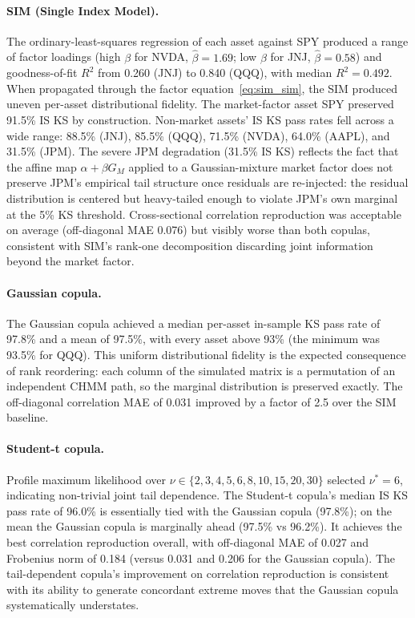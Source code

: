 \paragraph{SIM (Single Index Model).}
The ordinary-least-squares regression of each asset against SPY produced a range of factor loadings (high $\beta$ for NVDA, $\hat{\beta} = 1.69$; low $\beta$ for JNJ, $\hat{\beta} = 0.58$) and goodness-of-fit $R^2$ from 0.260 (JNJ) to 0.840 (QQQ), with median $R^2 = 0.492$.
When propagated through the factor equation~\eqref{eq:sim_sim}, the SIM produced uneven per-asset distributional fidelity.
The market-factor asset SPY preserved 91.5\% IS KS by construction.
Non-market assets' IS KS pass rates fell across a wide range: 88.5\% (JNJ), 85.5\% (QQQ), 71.5\% (NVDA), 64.0\% (AAPL), and 31.5\% (JPM).
The severe JPM degradation (31.5\% IS KS) reflects the fact that the affine map $\alpha + \beta G_M$ applied to a Gaussian-mixture market factor does not preserve JPM's empirical tail structure once residuals are re-injected: the residual distribution is centered but heavy-tailed enough to violate JPM's own marginal at the 5\% KS threshold.
Cross-sectional correlation reproduction was acceptable on average (off-diagonal MAE 0.076) but visibly worse than both copulas, consistent with SIM's rank-one decomposition discarding joint information beyond the market factor.

\paragraph{Gaussian copula.}
The Gaussian copula achieved a median per-asset in-sample KS pass rate of 97.8\% and a mean of 97.5\%, with every asset above 93\% (the minimum was 93.5\% for QQQ).
This uniform distributional fidelity is the expected consequence of rank reordering: each column of the simulated matrix is a permutation of an independent CHMM path, so the marginal distribution is preserved exactly.
The off-diagonal correlation MAE of 0.031 improved by a factor of 2.5 over the SIM baseline.

\paragraph{Student-t copula.}
Profile maximum likelihood over $\nu \in \{2, 3, 4, 5, 6, 8, 10, 15, 20, 30\}$ selected $\nu^* = 6$, indicating non-trivial joint tail dependence.
The Student-t copula's median IS KS pass rate of 96.0\% is essentially tied with the Gaussian copula (97.8\%); on the mean the Gaussian copula is marginally ahead (97.5\% vs 96.2\%).
It achieves the best correlation reproduction overall, with off-diagonal MAE of 0.027 and Frobenius norm of 0.184 (versus 0.031 and 0.206 for the Gaussian copula).
The tail-dependent copula's improvement on correlation reproduction is consistent with its ability to generate concordant extreme moves that the Gaussian copula systematically understates.

